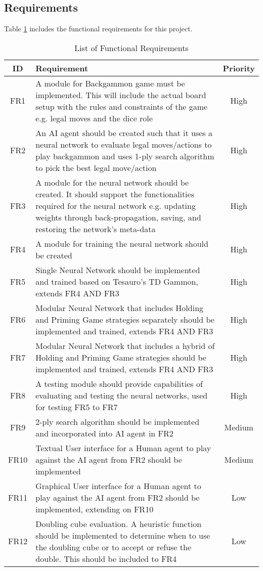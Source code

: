 \documentclass[12pt,a4paper]{article}
\begin{document}
\subsection{Requirements}
Table \ref{req} includes the functional requirements for this project.
\begin{table}[htb]
    \centering
    \caption{List of Functional Requirements}
    \vspace*{6pt}
    \label{req}
    \begin{tabular}{cp{12cm}c}
        \hline
        \hline
        ID & Requirement & Priority \\ 
        \hline
        FR1 & A module for Backgammon game must be implemented. This will include the actual board setup with the rules and constraints of the game e.g. legal moves and the dice role & High \\
        \hline
        FR2 & An AI agent should be created such that it uses a neural network to evaluate legal moves/actions to play backgammon and uses 1-ply search algorithm to pick the best legal move/action & High \\
        \hline
        FR3 & A module for the neural network should be created. It should support the functionalities required for the neural network e.g. updating weights through back-propagation, saving, and restoring the network's meta-data & High \\
        \hline
        FR4 & A module for training the neural network should be created & High \\
        \hline
        FR5 & Single Neural Network should be implemented and trained based on Tesauro's TD Gammon, extends FR4 AND FR3 & High \\
        \hline
        FR6 & Modular Neural Network that includes Holding and Priming Game strategies separately should be implemented and trained, extends FR4 AND FR3 & High \\
        \hline
        FR7 & Modular Neural Network that includes a hybrid of Holding and Priming Game strategies should be implemented and trained, extends FR4 AND FR3 & High \\
        \hline
        FR8 & A testing module should provide capabilities of evaluating and testing the neural networks, used for testing FR5 to FR7 & High \\
        \hline
        FR9 & 2-ply search algorithm should be implemented and incorporated into AI agent in FR2 & Medium \\
        \hline
        FR10 & Textual User interface for a Human agent to play against the AI agent from FR2 should be implemented & Medium \\
        \hline
        FR11 & Graphical User interface for a Human agent to play against the AI agent from FR2 should be implemented, extending on FR10 & Low \\
        \hline
        FR12 & Doubling cube evaluation. A heuristic function should be implemented to determine when to use the doubling cube or to accept or refuse the double. This should be included to FR4 & Low \\
        \hline
    \end{tabular}
\end{table}
\end{document}
